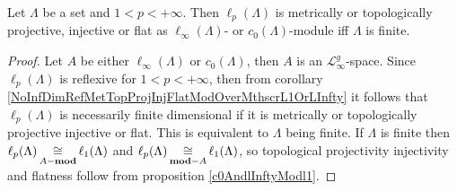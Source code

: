 \begin{proposition}\label{c0AndlInftyModlp} Let $\Lambda$ be a set and $1<p<+\infty$. Then $\ell_p(\Lambda)$ is metrically or topologically projective, injective or flat as $\ell_\infty(\Lambda)$- or $c_0(\Lambda)$-module iff $\Lambda$ is finite.
\end{proposition}
\begin{proof} Let $A$ be either $\ell_\infty(\Lambda)$ or $c_0(\Lambda)$, then $A$ is an $\mathscr{L}_\infty^g$-space. Since $\ell_p(\Lambda)$ is reflexive for $1<p<+\infty$, then from corollary  \ref{NoInfDimRefMetTopProjInjFlatModOverMthscrL1OrLInfty} it follows that $\ell_p(\Lambda)$ is necessarily finite dimensional if it is metrically or topologically projective injective or flat. This is equivalent to $\Lambda$ being finite. If $\Lambda$ is finite then $\ell_p(\Lambda)\mathop{\mathbin{\cong}}\limits_{A-\mathbf{mod}}\ell_1(\Lambda)$ and $\ell_p(\Lambda)\mathop{\mathbin{\cong}}\limits_{\mathbf{mod}-A}\ell_1(\Lambda)$, so topological projectivity injectivity and flatness follow from proposition \ref{c0AndlInftyModl1}.
\end{proof}

